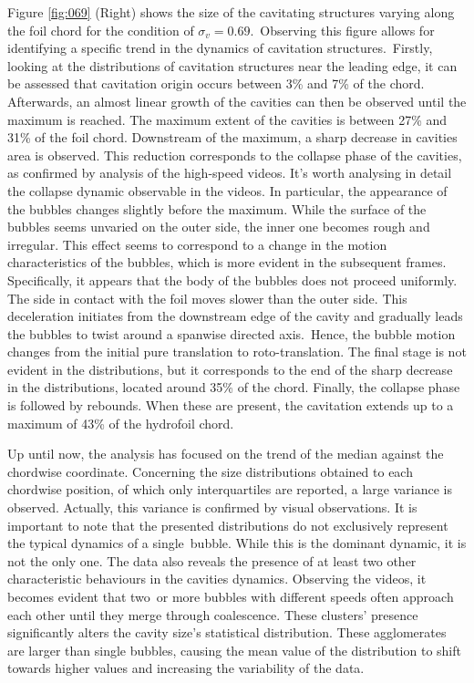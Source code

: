 Figure \ref{fig:069} (Right) shows the size of the cavitating structures varying along the foil chord for the condition of $\sigma_v = 0.69$. Observing this figure allows for identifying a specific trend in the dynamics of cavitation structures. Firstly, looking at the distributions of cavitation structures near the leading edge, it can be assessed that cavitation origin occurs between 3\% and 7\% of the chord. Afterwards, an almost linear growth of the cavities can then be observed until the maximum is reached. The maximum extent of the cavities is between 27\% and 31\% of the foil chord.
Downstream of the maximum, a sharp decrease in cavities area is observed. This reduction corresponds to the collapse phase of the cavities, as confirmed by analysis of the high-speed videos.
It's worth analysing in detail the collapse dynamic observable in the videos.
In particular, the appearance of the bubbles changes slightly before the maximum. While the surface of the bubbles seems unvaried on the outer side, the inner one becomes rough and irregular. This effect seems to correspond to a change in the motion characteristics of the bubbles, which is more evident in the subsequent frames.
Specifically, it appears that the body of the bubbles does not proceed uniformly. The side in contact with the foil moves slower than the outer side. 
This deceleration initiates from the downstream edge of the cavity and gradually leads the bubbles to twist around a spanwise directed axis. Hence, the bubble motion changes from the initial pure translation to roto-translation.
The final stage is not evident in the distributions, but it corresponds to the end of the sharp decrease in the distributions, located around 35\% of the chord.
Finally, the collapse phase is followed by rebounds. When these are present, the cavitation extends up to a maximum of 43\% of the hydrofoil chord.

Up until now, the analysis has focused on the trend of the median against the chordwise coordinate. Concerning the size distributions obtained to each chordwise position, of which only interquartiles are reported, a large variance is observed. Actually, this variance is confirmed by visual observations.
It is important to note that the presented distributions do not exclusively represent the typical dynamics of a single bubble. While this is the dominant dynamic, it is not the only one. The data also reveals the presence of at least two other characteristic behaviours in the cavities dynamics.
Observing the videos, it becomes evident that two or more bubbles with different speeds often approach each other until they merge through coalescence. These clusters' presence significantly alters the cavity size's statistical distribution. These agglomerates are larger than single bubbles, causing the mean value of the distribution to shift towards higher values and increasing the variability of the data.

